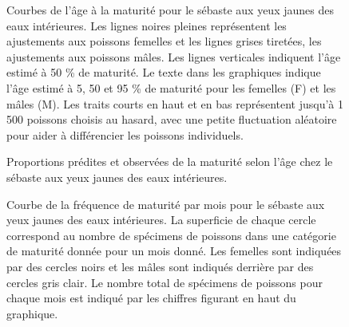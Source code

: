 \documentclass[french,11pt]{book}
\begin{document}
\begin{figure}[htb]

{\centering {} 

}

\caption{Courbes de l'âge à la maturité pour le sébaste aux yeux jaunes des eaux intérieures. Les lignes noires pleines représentent les ajustements aux poissons femelles et les lignes grises tiretées, les ajustements aux poissons mâles. Les lignes verticales indiquent l'âge estimé à 50 \% de maturité. Le texte dans les graphiques indique l'âge estimé à 5, 50 et 95 \% de maturité pour les femelles (F) et les mâles (M). Les traits courts en haut et en bas représentent jusqu'à 1 500 poissons choisis au hasard, avec une petite fluctuation aléatoire pour aider à différencier les poissons individuels.}\label{fig:percent-maturity}
\end{figure}

\begin{figure}[htb]

{\centering {} 

}

\caption{Proportions prédites et observées de la maturité selon l'âge chez le sébaste aux yeux jaunes des eaux intérieures.}\label{fig:prop-mature}
\end{figure}

\begin{figure}[htb]

{\centering {} 

}

\caption{Courbe de la fréquence de maturité par mois pour le sébaste aux yeux jaunes des eaux intérieures. La superficie de chaque cercle correspond au nombre de spécimens de poissons dans une catégorie de maturité donnée pour un mois donné. Les femelles sont indiquées par des cercles noirs et les mâles sont indiqués derrière par des cercles gris clair. Le nombre total de spécimens de poissons pour chaque mois est indiqué par les chiffres figurant en haut du graphique.}\label{fig:mat-months}
\end{figure}
\clearpage
\end{document}
